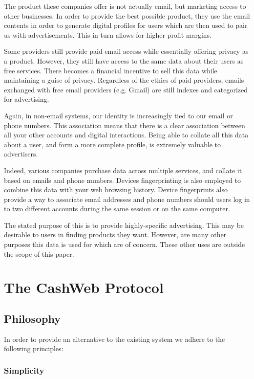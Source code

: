 \documentclass{article}
\theoremstyle{definition}
\begin{document}
The product these companies offer is not actually email, but marketing access to other businesses. In order to provide the best possible product, they use the email contents in order to generate digital profiles for users which are then used to pair us with advertisements. This in turn allows for higher profit margins.

Some providers still provide paid email access while essentially offering privacy as a product. However, they still have access to the same data about their users as free services. There becomes a financial incentive to sell this data while maintaining a guise of privacy. Regardless of the ethics of paid providers, emails exchanged with free email providers (e.g. Gmail) are still indexes and categorized for advertising.

Again, in non-email systems, our identity is increasingly tied to our email or phone numbers. This association means that there is a clear association between all your other accounts and digital interactions. Being able to collate all this data about a user, and form a more complete profile, is extremely valuable to advertisers.

Indeed, various companies purchase data across multiple services, and collate it based on emails and phone numbers. Devices fingerprinting is also employed to combine this data with your web browsing history. Device fingerprints also provide a way to associate email addresses and phone numbers should users log in to two different accounts during the same session or on the same computer.

The stated purpose of this is to provide highly-specific advertising. This may be desirable to users in finding products they want. However, are many other purposes this data is used for which are of concern. These other uses are outside the scope of this paper.

\section{The CashWeb Protocol}

\subsection{Philosophy}

In order to provide an alternative to the existing system we adhere to the following principles:

\subsubsection{Simplicity}
\end{document}
